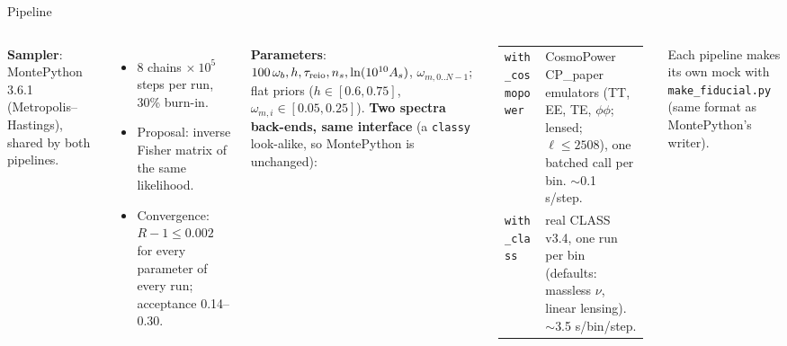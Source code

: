 \documentclass[aspectratio=169,10pt]{beamer}
\begin{document}
\begin{frame}{Pipeline}
\begin{columns}[T]
{\bfseries Sampler}: MontePython 3.6.1 (Metropolis--Hastings), shared by both pipelines.
\begin{itemize}\small
  \item 8 chains $\times\ 10^5$ steps per run, 30\% burn-in.
  \item Proposal: inverse Fisher matrix of the same likelihood.
  \item Convergence: $R-1 \le 0.002$ for every parameter of every run; acceptance 0.14--0.30.
\end{itemize}
\vspace{0.4em}
{\bfseries Parameters}: $100\,\omega_b, h, \tau_{\rm reio}, n_s, \ln(10^{10}A_s)$, $\omega_{m,0..N-1}$; flat priors
($h\in[0.6,0.75]$, $\omega_{m,i}\in[0.05,0.25]$).
{\bfseries Two spectra back-ends, same interface} (a \texttt{classy} look-alike, so MontePython is unchanged):
\vspace{0.3em}
\begin{center}\small
\begin{tabular}{@{}p{0.27\linewidth}p{0.69\linewidth}@{}}
\toprule
\texttt{with\_}\newline\texttt{cosmopower} & CosmoPower CP\_paper emulators (TT, EE, TE, $\phi\phi$; lensed; $\ell\le2508$), one batched call per bin. $\sim$0.1 s/step. \\
\addlinespace
\texttt{with\_class} & real CLASS v3.4, one run per bin (defaults: massless $\nu$, linear lensing). $\sim$3.5 s/bin/step. \\
\bottomrule
\end{tabular}
\end{center}
\vspace{0.3em}
{\small Each pipeline makes its own mock with \texttt{make\_fiducial.py} (same format as MontePython's writer).}
\end{columns}
\end{frame}
\end{document}
